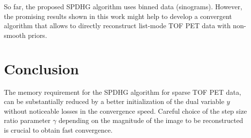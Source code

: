 \documentclass[11pt,twocolumn,twoside]{article}
\begin{document}
So far, the proposed SPDHG algorithm uses binned data (sinograms).
However, the promising results shown in this work might help to develop a convergent
algorithm that allows to directly reconstruct list-mode TOF PET data with non-smooth
priors.

\section{Conclusion}

The memory requirement for the SPDHG algorithm for sparse TOF PET data, can be
substantially reduced by a better initialization of the dual variable $y$ without
noticeable losses in the convergence speed.
Careful choice of the step size ratio parameter $\gamma$ depending on the magnitude
of the image to be reconstructed is crucial to obtain fast convergence.

\printbibliography
\end{document}
